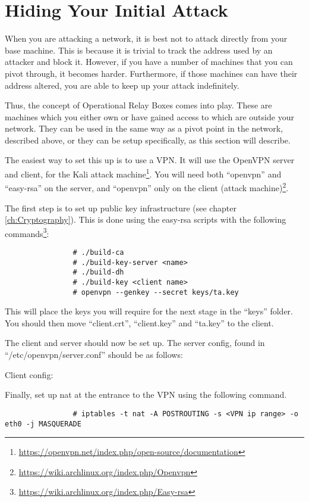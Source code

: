 	\section{Hiding Your Initial Attack}
		When you are attacking a network, it is best not to attack directly from your base machine.
		This is because it is trivial to track the address used by an attacker and block it.
		However, if you have a number of machines that you can pivot through, it becomes harder.
		Furthermore, if those machines can have their address altered, you are able to keep up your attack indefinitely.

		Thus, the concept of Operational Relay Boxes comes into play.
		These are machines which you either own or have gained access to which are outside your network.
		They can be used in the same way as a pivot point in the network, described above, or they can be setup specifically, as this section will describe.

		 
		The easiest way to set this up is to use a VPN.
		It will use the OpenVPN server and client, for the Kali attack machine\footnote{\url{https://openvpn.net/index.php/open-source/documentation}}.
		You will need both ``openvpn'' and ``easy-rsa'' on the server, and ``openvpn'' only on the client (attack machine)\footnote{\url{https://wiki.archlinux.org/index.php/Openvpn}}.

		The first step is to set up public key infrastructure (see chapter \ref{ch:Cryptography}).
		This is done using the easy-rsa scripts with the following commands\footnote{\url{https://wiki.archlinux.org/index.php/Easy-rsa}}:
			\begin{verbatim}
				# ./build-ca
				# ./build-key-server <name>
				# ./build-dh
				# ./build-key <client name>
				# openvpn --genkey --secret keys/ta.key
			\end{verbatim}
		This will place the keys you will require for the next stage in the ``keys'' folder.
		You should then move ``client.crt'', ``client.key'' and ``ta.key'' to the client.

		The client and server should now be set up.
		The server config, found in ``/etc/openvpn/server.conf'' should be as follows:
		
		Client config:
		
		Finally, set up nat at the entrance to the VPN using the following command.
			\begin{verbatim}
				# iptables -t nat -A POSTROUTING -s <VPN ip range> -o eth0 -j MASQUERADE
			\end{verbatim}


